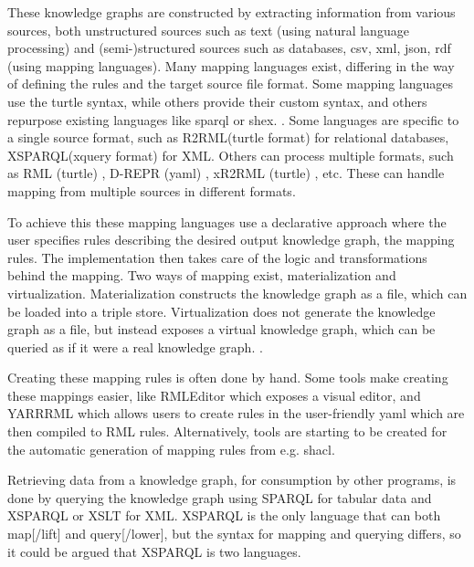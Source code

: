 These knowledge graphs are constructed by extracting information from various sources, both unstructured sources such as text (using natural language processing) and (semi-)structured sources such as databases, \acrshort{csv}, \acrshort{xml}, \acrshort{json}, \acrshort{rdf} (using mapping languages). Many mapping languages exist, differing in the way of defining the rules and the target source file format. Some mapping languages use the turtle syntax, while others provide their custom syntax, and others repurpose existing languages like \acrshort{sparql} or \acrshort{shex}. \citep{VANASSCHE2023100753}. Some languages are specific to a single source format, such as R2RML(turtle format) \citep{Das:12:RRR} for relational databases, XSPARQL(\acrshort{xquery} format) \citep{Bischof2012} for XML. Others can process multiple formats, such as RML (turtle) \citep{dimou_ldow_2014}, D-REPR (\acrshort{yaml}) \citep{d-repr}, xR2RML (turtle) \citep{xR2RML}, etc. These can handle mapping from multiple sources in different formats.

To achieve this these mapping languages use a declarative approach where the user specifies rules describing the desired output knowledge graph, the mapping rules. The implementation then takes care of the logic and transformations behind the mapping. Two ways of mapping exist, materialization and virtualization. Materialization constructs the knowledge graph as a file, which can be loaded into a triple store. Virtualization does not generate the knowledge graph as a file, but instead exposes a virtual knowledge graph, which can be queried as if it were a real knowledge graph. \citep{ontop}.

Creating these mapping rules is often done by hand. Some tools make creating these mappings easier, like RMLEditor \citep{heyvaert_jws_2018} which exposes a visual editor, and YARRRML \citep{10.1007/978-3-319-98192-5_40} which allows users to create rules in the user-friendly \acrshort{yaml} which are then compiled to RML rules. Alternatively, tools are starting to be created for the automatic generation of mapping rules from e.g. \acrshort{shacl}.

Retrieving data from a knowledge graph, for consumption by other programs, is done by querying the knowledge graph using SPARQL \citep{Seaborne:08:SQL} for tabular data and XSPARQL \citep{Bischof2012} or XSLT for XML. XSPARQL is the only language that can both map[/lift] and query[/lower], but the syntax for mapping and querying differs, so it could be argued that XSPARQL is two languages.

